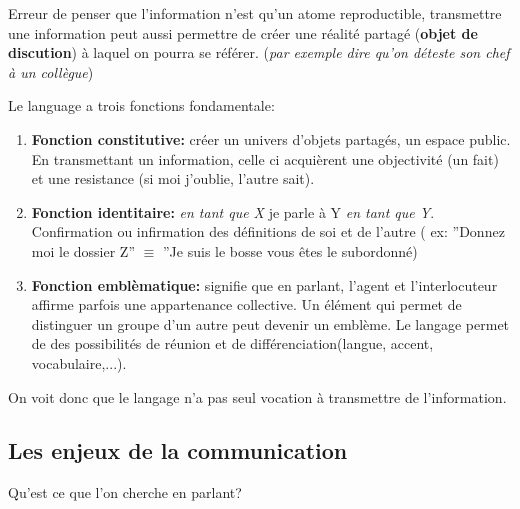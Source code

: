 \documentclass[11pt]{article} %
\begin{document}
\begin{enumerate}
     Erreur de penser que l'information n'est qu'un atome reproductible,
     transmettre une information peut aussi permettre de créer une
     réalité partagé (\textbf{objet de discution}) à laquel on
     pourra se référer. (\textit{par exemple dire qu'on déteste son
     chef à un collègue})

     Le language a trois fonctions fondamentale:

    \begin{enumerate}
        \item \textbf{Fonction constitutive:} créer un univers
        d'objets partagés, un espace public. En transmettant un
        information, celle ci acquièrent une objectivité (un fait) et
        une resistance (si moi j'oublie, l'autre sait).

        \item \textbf{Fonction identitaire:} \textit{en tant que X} je
        parle à Y \textit{en tant que Y}. Confirmation ou infirmation
        des définitions de soi et de l'autre ( ex: ''Donnez moi le
        dossier Z'' $\equiv$ ''Je suis le bosse vous êtes le subordonné)

        \item \textbf{Fonction emblèmatique:} signifie que en
        parlant, l'agent et l'interlocuteur affirme parfois une
        appartenance collective. Un élément qui permet de
        distinguer un groupe d'un autre peut devenir un emblème.
        Le langage permet de des possibilités de réunion et de
        différenciation(langue, accent, vocabulaire,...).
    \end{enumerate}

    On voit donc que le langage n'a pas seul vocation à transmettre de l'information.

\end{enumerate}


\subsection{Les enjeux de la communication}
Qu'est ce que l'on cherche en parlant?
\end{document}
